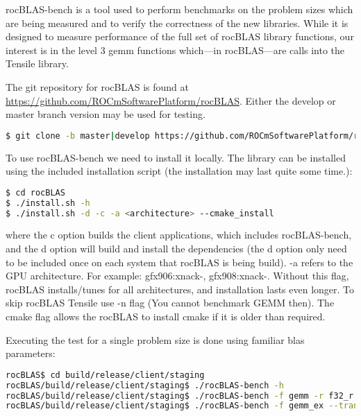 \documentclass[]{article}
\begin{document}
\label{sec:bench}

\noindent
rocBLAS-bench is a tool used to perform benchmarks on the problem sizes which are being measured and to verify the correctness of the new libraries. While it is designed to measure performance of the full set of rocBLAS library functions, our interest is in the level 3 gemm functions which---in rocBLAS---are calls into the Tensile library. 


The git repository for rocBLAS is found at \url{https://github.com/ROCmSoftwarePlatform/rocBLAS}. Either the develop or master branch version may be used for testing.

\begin{lstlisting}[language=bash]
$ git clone -b master|develop https://github.com/ROCmSoftwarePlatform/rocBLAS.git
\end{lstlisting}

To use rocBLAS-bench we need to install it locally. The library can be installed using the included installation script (the installation may last quite some time.):

\begin{lstlisting}[language=bash]
$ cd rocBLAS
$ ./install.sh -h
$ ./install.sh -d -c -a <architecture> --cmake_install
\end{lstlisting}

\noindent
where the c option builds the client applications, which includes rocBLAS-bench, and the d option will build and install the dependencies (the d option only need to be included once on each system that rocBLAS is being build). -a refers to the GPU architecture. For example: gfx906:xnack-, gfx908:xnack-. Without this flag, rocBLAS installs/tunes for all architectures, and installation lasts even longer. To skip rocBLAS Tensile use -n flag (You cannot benchmark GEMM then). The cmake flag allows the rocBLAS to install cmake if it is older than required.

\noindent
Executing the test for a single problem size is done using familiar blas parameters:

\begin{lstlisting}[language=bash]
rocBLAS$ cd build/release/client/staging
rocBLAS/build/release/client/staging$ ./rocBLAS-bench -h
rocBLAS/build/release/client/staging$ ./rocBLAS-bench -f gemm -r f32_r --transposeA N --transposeB T -m 1001 -n 1536 -k 64 --alpha 1.0 --lda 1001 --ldb 1536 --beta 0.0 --ldc 1001 -i 10
rocBLAS/build/release/client/staging$ ./rocBLAS-bench -f gemm_ex --transposeA N --transposeB T -m 1024 -n 1024-k 1024 --a_type h --lda 2048 --b_type h --ldb 2048 --beta 1 --c_type s --ldc 2048 --d_type s --ldd 2048 --compute_type s -v 1 --iters 10 --cold_iters 2
\end{lstlisting}
\end{document}
